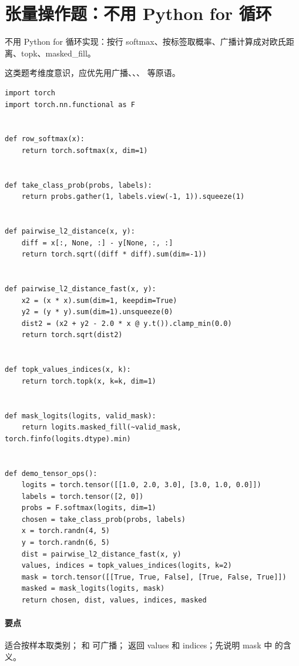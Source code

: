 \section{张量操作题：不用 Python for 循环}
\begin{interview}
不用 Python for 循环实现：按行 softmax、按标签取概率、广播计算成对欧氏距离、topk、masked\_fill。
\end{interview}
\begin{answer}
这类题考维度意识，应优先用广播、、、 等原语。
\begin{lstlisting}
import torch
import torch.nn.functional as F


def row_softmax(x):
    return torch.softmax(x, dim=1)


def take_class_prob(probs, labels):
    return probs.gather(1, labels.view(-1, 1)).squeeze(1)


def pairwise_l2_distance(x, y):
    diff = x[:, None, :] - y[None, :, :]
    return torch.sqrt((diff * diff).sum(dim=-1))


def pairwise_l2_distance_fast(x, y):
    x2 = (x * x).sum(dim=1, keepdim=True)
    y2 = (y * y).sum(dim=1).unsqueeze(0)
    dist2 = (x2 + y2 - 2.0 * x @ y.t()).clamp_min(0.0)
    return torch.sqrt(dist2)


def topk_values_indices(x, k):
    return torch.topk(x, k=k, dim=1)


def mask_logits(logits, valid_mask):
    return logits.masked_fill(~valid_mask, torch.finfo(logits.dtype).min)


def demo_tensor_ops():
    logits = torch.tensor([[1.0, 2.0, 3.0], [3.0, 1.0, 0.0]])
    labels = torch.tensor([2, 0])
    probs = F.softmax(logits, dim=1)
    chosen = take_class_prob(probs, labels)
    x = torch.randn(4, 5)
    y = torch.randn(6, 5)
    dist = pairwise_l2_distance_fast(x, y)
    values, indices = topk_values_indices(logits, k=2)
    mask = torch.tensor([[True, True, False], [True, False, True]])
    masked = mask_logits(logits, mask)
    return chosen, dist, values, indices, masked
\end{lstlisting}
\paragraph{要点}  适合按样本取类别； 和  可广播； 返回 values 和 indices；先说明 mask 中  的含义。
\end{answer}

